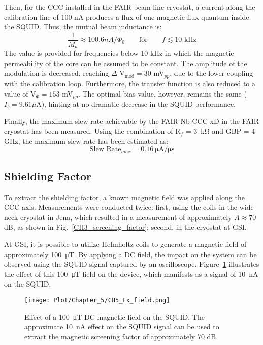 \documentclass[12pt,a4paper]{report}
\begin{document}
        Then, for the CCC installed in the FAIR beam-line cryostat, a current along the calibration line of 100 nA produces a flux of one magnetic flux quantum inside the SQUID. Thus, the mutual beam inductance is:
        \begin{equation} 
        	\frac{1}{M_a} \approx 100.6 nA/\Phi_0 \qquad \text{for} \qquad f\lesssim10 \text{ kHz}
        \end{equation}
        The value is provided for frequencies below 10 kHz in which the magnetic permeability of the core can be assumed to be constant. The amplitude of the modulation is decreased, reaching $\Delta$ V$_{\text{mod}} = 30$ mV$_{pp}$, due to the lower coupling with the calibration loop. Furthermore, the transfer function is also reduced to a value of V$_\Phi = {153}$ mV$_{pp}$. The optimal bias value, however, remains the same ($I_b = {9.61}\mu$A), hinting at no dramatic decrease in the SQUID performance.
        
        Finally, the maximum slew rate achievable by the FAIR-Nb-CCC-xD in the FAIR cryostat has been measured. Using the combination of R$_f$ = \SI{3}{\kilo\ohm} and GBP = 4 GHz, the maximum slew rate has been estimated as:
        \begin{equation}
        	\text{Slew Rate}_{max} = \SI{0.16}{\micro\ampere/\micro\second}
        \end{equation}
        \subsection{Shielding Factor}
        To extract the shielding factor, a known magnetic field was applied along the CCC axis. Measurements were conducted twice: first, using the coils in the wide-neck cryostat in Jena, which resulted in a measurement of approximately $A \approx 70$ dB, as shown in Fig.~\ref{CH3_screening_factor}; second, in the cryostat at GSI.
        
        At GSI, it is possible to utilize Helmholtz coils to generate a magnetic field of approximately \SI{100}{\micro\tesla}. By applying a DC field, the impact on the system can be observed using the SQUID signal captured by an oscilloscope. Figure~\ref{CH5_Ex_field} illustrates the effect of this \SI{100}{\micro\tesla} field on the device, which manifests as a signal of \SI{10}{\nano\ampere} on the SQUID.
        
        \begin{figure}[H]
        	\centering
        	\texttt{[image: Plot/Chapter\_5/CH5\_Ex\_field.png]}
        	\caption{\small{Effect of a \SI{100}{\micro\tesla} DC magnetic field on the SQUID. The approximate \SI{10}{\nano\ampere} effect on the SQUID signal can be used to extract the magnetic screening factor of approximately 70 dB.}}
        	\label{CH5_Ex_field}
        \end{figure}
        
\end{document}
